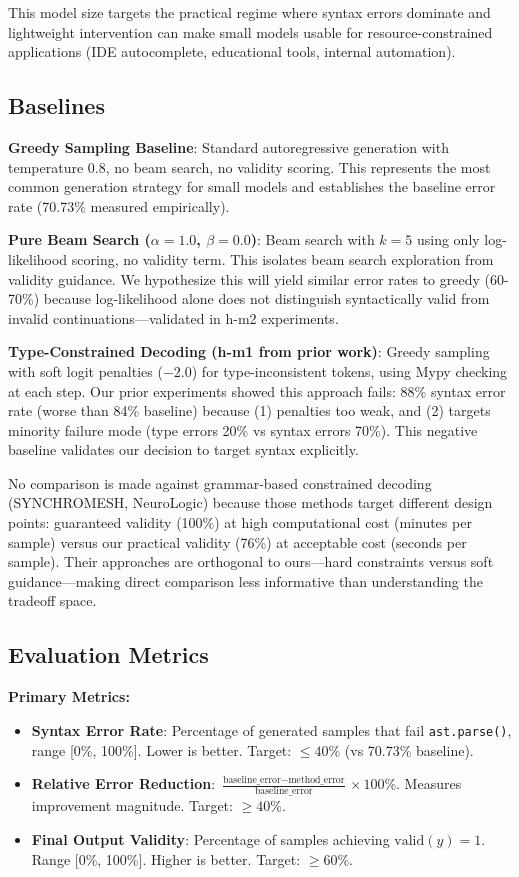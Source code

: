 This model size targets the practical regime where syntax errors dominate and lightweight intervention can make small models usable for resource-constrained applications (IDE autocomplete, educational tools, internal automation).

\subsection{Baselines}

\textbf{Greedy Sampling Baseline}: Standard autoregressive generation with temperature 0.8, no beam search, no validity scoring. This represents the most common generation strategy for small models and establishes the baseline error rate (70.73\% measured empirically).

\textbf{Pure Beam Search ($\alpha=1.0$, $\beta=0.0$)}: Beam search with $k=5$ using only log-likelihood scoring, no validity term. This isolates beam search exploration from validity guidance. We hypothesize this will yield similar error rates to greedy (60-70\%) because log-likelihood alone does not distinguish syntactically valid from invalid continuations---validated in h-m2 experiments.

\textbf{Type-Constrained Decoding (h-m1 from prior work)}: Greedy sampling with soft logit penalties ($-2.0$) for type-inconsistent tokens, using Mypy checking at each step. Our prior experiments showed this approach fails: 88\% syntax error rate (worse than 84\% baseline) because (1) penalties too weak, and (2) targets minority failure mode (type errors 20\% vs syntax errors 70\%). This negative baseline validates our decision to target syntax explicitly.

No comparison is made against grammar-based constrained decoding (SYNCHROMESH, NeuroLogic) because those methods target different design points: guaranteed validity (100\%) at high computational cost (minutes per sample) versus our practical validity (76\%) at acceptable cost (seconds per sample). Their approaches are orthogonal to ours---hard constraints versus soft guidance---making direct comparison less informative than understanding the tradeoff space.

\subsection{Evaluation Metrics}

\textbf{Primary Metrics:}
\begin{itemize}
\item \textbf{Syntax Error Rate}: Percentage of generated samples that fail \texttt{ast.parse()}, range [0\%, 100\%]. Lower is better. Target: $\leq 40$\% (vs 70.73\% baseline).
\item \textbf{Relative Error Reduction}: $\frac{\text{baseline\_error} - \text{method\_error}}{\text{baseline\_error}} \times 100\%$. Measures improvement magnitude. Target: $\geq 40$\%.
\item \textbf{Final Output Validity}: Percentage of samples achieving $\text{valid}(y)=1$. Range [0\%, 100\%]. Higher is better. Target: $\geq 60$\%.
\end{itemize}

